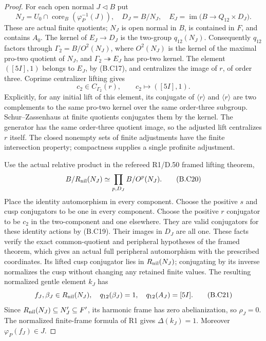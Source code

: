\begin{proof}
For each open normal $J\triangleleft B$ put
\[
 N_J=U_0\cap\operatorname{core}_B(\varphi_P^{-1}(J)),\quad
 D_J=B/N_J,\quad
 E_J=\operatorname{im}\bigl(B\longrightarrow Q_{12}\times D_J\bigr).
 \tag{B.C18}
\]
These are actual finite quotients; $N_J$ is open normal
in $B$, is contained in $F$, and contains $A_0$.
The kernel of $E_J\to D_J$ is the two-group $q_{12}(N_J)$.
Consequently $q_{12}$ factors through
$\Gamma_2=B/O^2(N_J)$, where $O^2(N_J)$ is the kernel of
the maximal pro-two quotient of $N_J$, and
$\Gamma_2\twoheadrightarrow E_J$ has pro-two kernel.
The element $([5I],1)$ belongs to $E_J$, by (B.C17), and
centralizes the image of $r$, of order three.  Coprime
centralizer lifting gives
\[
 c_2\in C_{\Gamma_2}(r),\qquad c_2\longmapsto([5I],1).
 \tag{B.C19}
\]
Explicitly, for any initial lift of this element, its
conjugate of $\langle r\rangle$ and $\langle r\rangle$
are two complements to the same pro-two kernel over the
same order-three subgroup.  Schur--Zassenhaus at finite
quotients conjugates them by the kernel.  The generator
has the same order-three quotient image, so the adjusted
lift centralizes $r$ itself.  The closed nonempty sets of
finite adjustments have the finite intersection property;
compactness supplies a single profinite adjustment.

Use the actual relative product in the refereed R1/D.50
framed lifting theorem,
\[
 B/R_{\rm nil}(N_J)\simeq
              \prod_{p,D_J} B/O^p(N_J).                  \tag{B.C20}
\]
Place the identity automorphism in every component.
Choose the positive $s$ and cusp conjugators to be one
in every component.  Choose the positive $r$ conjugator
to be $c_2$ in the two-component and one elsewhere.
They are valid conjugators for these identity actions by
(B.C19).  Their images in $D_J$ are all one.  These facts
verify the exact common-quotient and peripheral hypotheses
of the framed theorem, which gives an actual full
peripheral automorphism with the prescribed coordinates.
Its lifted cusp conjugator lies in $R_{\rm nil}(N_J)$;
conjugating by its inverse normalizes the cusp without
changing any retained finite values.  The resulting
normalized gentle element $k_J$ has
\[
 f_J,\beta_J\in R_{\rm nil}(N_J),\quad
 q_{12}(\beta_J)=1,\quad q_{12}(A_J)=[5I].
 \tag{B.C21}
\]
Since $R_{\rm nil}(N_J)\subseteq N_J'\subseteq F'$, its
harmonic frame has zero abelianization, so $\rho_J=0$.
The normalized finite-frame formula of R1 gives
$\Delta(k_J)=1$.  Moreover $\varphi_P(f_J)\in J$.


\end{proof}
